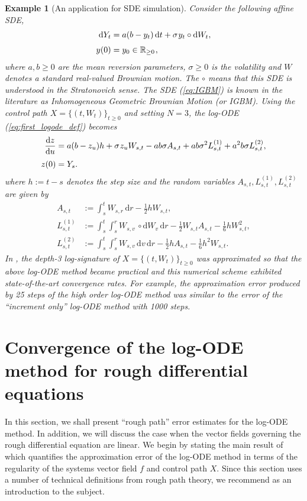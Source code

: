 \documentclass{article}
\newcommand{\R}{\mathbb{R}}
\newcommand{\m}{\hspace{0.25mm}}
\newtheorem{example}[theorem]{Example}
\newcommand{\dby}{\mathrm{d}}
\begin{document}
\begin{example}[An application for SDE simulation] Consider the following affine SDE,
\begin{align}\label{eq:IGBM}
\dby Y_t & = a(b-y_t)\,\dby t + \sigma\m y_t\circ \dby W_t,\\[3pt]
y(0) & = y_0\in\R_{\geq 0}\m,\nonumber
\end{align}
where $a,b\geq 0$ are the mean reversion parameters, $\sigma\geq 0$ is the volatility and $W$ denotes a standard real-valued Brownian motion. The $\circ$ means that this SDE is understood in the Stratonovich sense.
The SDE (\ref{eq:IGBM}) is known in the literature as Inhomogeneous Geometric Brownian Motion (or IGBM).
Using the control path $X = \{(t, W_t)\}_{t\geq 0}$ and setting $N = 3$, the log-ODE (\ref{eq:first_logode_def}) becomes
\begin{align*}
\frac{\dby z}{\dby u} & = a(b-z_u)h + \sigma\m z_u W_{s,t} - ab\sigma A_{s,t} + ab\sigma^2 L_{s,t}^{(1)} + a^2b\sigma L_{s,t}^{(2)},\\[3pt]
z(0) & = Y_s.
\end{align*}
where $h := t- s$ denotes the step size and the random variables $A_{s,t}, L_{s,t}^{(1)}, L_{s,t}^{(2)}$ are given by
\begin{align*}
A_{s,t} & := \int_s^t W_{s,r}\,\dby r - \frac{1}{2}hW_{s,t},\\[3pt]
L_{s,t}^{(1)} & := \int_s^t\int_s^r W_{s,v}\,\circ \dby W_v\,\dby r - \frac{1}{2}W_{s,t}A_{s,t} - \frac{1}{6}hW_{s,t}^2,\\[3pt]
L_{s,t}^{(2)} & := \int_s^t\int_s^r W_{s,v}\,\dby v\,\dby r - \frac{1}{2}h A_{s,t} - \frac{1}{6}h^2W_{s,t}.
\end{align*}
In \citet{foster2020poly}, the depth-3 log-signature of $X = \{(t, W_t)\}_{t\geq 0}$ was approximated so that the above log-ODE method became practical and this numerical scheme exhibited state-of-the-art convergence rates. For example, the approximation error produced by 25 steps of the
high order log-ODE method was similar to the error of the ``increment only'' log-ODE method with 1000 steps.
\end{example}

%
 
\section{Convergence of the log-ODE method for rough differential equations}\label{apx:logodeconv}

In this section, we shall present ``rough path'' error estimates for the log-ODE method. In addition, we will discuss the case when the vector fields governing the rough differential equation are linear.
We begin by stating the main result of \citet{logode2014estimate} which quantifies the approximation error of the log-ODE method in terms of the regularity of the systems vector field $f$ and control path $X$.
Since this section uses a number of technical definitions from rough path theory, we recommend \citet{roughpath2007notes} as an introduction to the subject. 
\end{document}
